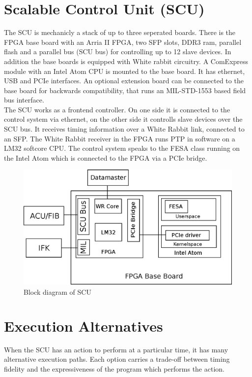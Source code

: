 \documentclass{JAC2003}
\begin{document}
\section{Scalable Control Unit (SCU)}
The SCU is mechanicly a stack of up to three seperated boards. There is the FPGA base board
with an Arria II FPGA, two SFP slots, DDR3 ram, parallel flash and a parallel bus (SCU bus) for
controlling up to 12 slave devices. In addition the base boards is equipped with White rabbit circuitry.
A ComExpress module with an Intel Atom CPU is mounted to
the base board. It has ethernet, USB and PCIe interfaces. An optional extension board can
be connected to the base board for backwards compatibility, that runs an MIL-STD-1553 based
field bus interface.\\
The SCU works as a frontend controller. On one side it is connected to the control system via ethernet,
on the other side it controlls slave devices over the SCU bus. It receives timing information over
a White Rabbit link, connected to an SFP. The White Rabbit receiver in the FPGA runs PTP in software
on a LM32 softcore CPU. The control system speaks to the FESA class running
on the Intel Atom which is connected to the FPGA via a PCIe bridge.
 


\begin{figure}[t]
   \centering
   \includegraphics*[width=\columnwidth]{scu_schema}
   \caption{Block diagram of SCU}
\end{figure}


\section{Execution Alternatives}
When the SCU has an action to perform at a particular time, 
it has many alternative execution paths.
Each option carries a trade-off between timing fidelity and 
the expressiveness of the program which performs the action.
\end{document}
